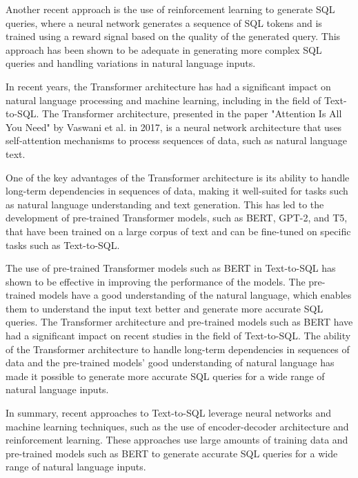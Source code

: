 Another recent approach is the use of reinforcement learning to generate SQL queries, where a neural network generates a sequence of SQL tokens and is trained using a reward signal based on the quality of the generated query. This approach has been shown to be adequate in generating more complex SQL queries and handling variations in natural language inputs.

In recent years, the Transformer architecture has had a significant impact on natural language processing and machine learning, including in the field of Text-to-SQL. The Transformer architecture, presented in the paper "Attention Is All You Need" by Vaswani et al. in 2017, is a neural network architecture that uses self-attention mechanisms to process sequences of data, such as natural language text.

One of the key advantages of the Transformer architecture is its ability to handle long-term dependencies in sequences of data, making it well-suited for tasks such as natural language understanding and text generation. This has led to the development of pre-trained Transformer models, such as BERT, GPT-2, and T5, that have been trained on a large corpus of text and can be fine-tuned on specific tasks such as Text-to-SQL.

The use of pre-trained Transformer models such as BERT in Text-to-SQL has shown to be effective in improving the performance of the models. The pre-trained models have a good understanding of the natural language, which enables them to understand the input text better and generate more accurate SQL queries.
The Transformer architecture and pre-trained models such as BERT have had a significant impact on recent studies in the field of Text-to-SQL. The ability of the Transformer architecture to handle long-term dependencies in sequences of data and the pre-trained models' good understanding of natural language has made it possible to generate more accurate SQL queries for a wide range of natural language inputs.

In summary, recent approaches to Text-to-SQL leverage neural networks and machine learning techniques, such as the use of encoder-decoder architecture and reinforcement learning. These approaches use large amounts of training data and pre-trained models such as BERT to generate accurate SQL queries for a wide range of natural language inputs.